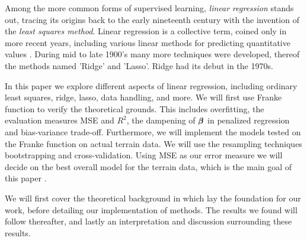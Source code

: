 Among the more common forms of supervised learning, \textit{linear regression} stands out, tracing its origins back to the early nineteenth century with the invention of the \textit{least squares method}. 
Linear regression is a collective term, coined only in more recent years, including various linear methods for predicting quantitative values \citep[ p.~5]{james}. During mid to late 1900's many more techniques were developed, thereof the methods named 'Ridge' and 'Lasso'. Ridge had its debut in the 1970s. 


In this paper we explore different aspects of linear regression, including ordinary least squares, ridge, lasso, data handling, and more. 
We will first use Franke function to verify the theoretical grounds. This includes overfitting, the evaluation measures MSE and $R^2$, the dampening of $\boldsymbol{\beta}$ in penalized regression and bias-variance trade-off. Furthermore, we will implement the models tested on the Franke function on actual terrain data. We will use the resampling techniques bootstrapping and cross-validation. Using MSE as our error measure we will decide on the best overall model for the terrain data, which is the main goal of this paper . 


We will first cover the theoretical background in which lay the foundation for our work, before detailing our implementation of methods. 
The results we found will follow thereafter, and lastly an interpretation and discussion surrounding these results. 

